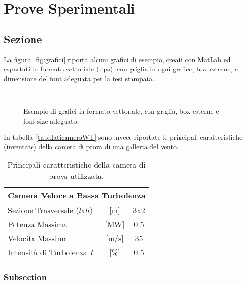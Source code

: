 %
%
\chapter{Prove Sperimentali}
%
\label{cap:provesperimentali}
%
%
\section{Sezione}
La figura~\vref{fig:grafici} riporta alcuni grafici di esempio, creati con MatLab ed esportati in formato vettoriale (.eps), con griglia in ogni grafico, box esterno, e dimensione del font adeguata per la tesi stampata.
%
%
\begin{figure}
%
\centering
%
%
\\
%
%
\caption[Esempio di grafici]{Esempio di grafici in formato vettoriale, con griglia, box esterno e font size adeguato.}
%
\label{fig:grafici}
%
\end{figure}
%
%
In tabella~\vref{tab:daticameraWT} sono invece riportate le principali caratteristiche (inventate) della camera di prova di una galleria del vento.
%
%
\begin{table}
%
\caption{Principali caratteristiche della camera di prova utilizzata.}
%
\label{tab:daticameraWT}
%
\centering
%
\begin{tabular}{lcc}
%
\toprule
%
\multicolumn{3}{c}{\bfseries Camera Veloce a Bassa Turbolenza}\\
%
\midrule
%
Sezione Trasversale ($l$x$h$)	& [m]	& $3$x$2$ \\
Potenza Massima 		& [MW]	& \num{0.5} \\
Velocità Massima		& [m/s]	& \num{35} \\
Intensità di Turbolenza $I$ 	& [\%]	& \num{0.5} \\
%
\bottomrule
%
\end{tabular}
%
\end{table}
%
%
\subsection{Subsection}
%
\lipsum[1-5]
%
